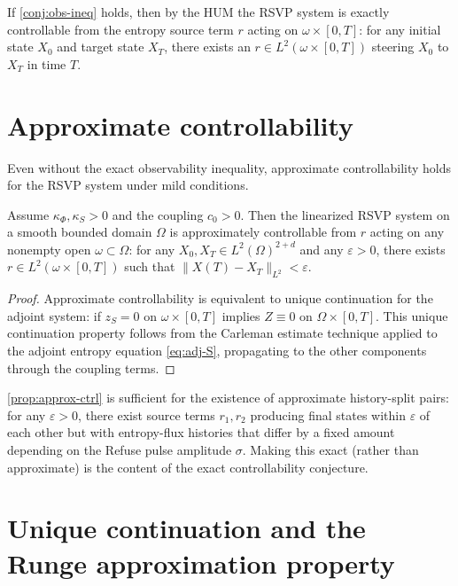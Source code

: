 \documentclass[12pt, oneside]{memoir}
\newcommand{\nnorm}[1]{\lVert #1 \rVert}
\begin{document}
If \cref{conj:obs-ineq} holds, then by the HUM the RSVP system is exactly controllable
from the entropy source term $r$ acting on $\omega \times [0,T]$: for any initial state
$X_0$ and target state $X_T$, there exists an $r \in L^2(\omega \times [0,T])$ steering
$X_0$ to $X_T$ in time $T$.

\section{Approximate controllability}

Even without the exact observability inequality, approximate controllability holds for
the RSVP system under mild conditions.

\begin{proposition}
\label{prop:approx-ctrl}
Assume $\kappa_\Phi, \kappa_S > 0$ and the coupling $c_0 > 0$.  Then the linearized
RSVP system on a smooth bounded domain $\Omega$ is approximately controllable from $r$
acting on any nonempty open $\omega \subset \Omega$: for any $X_0, X_T \in
L^2(\Omega)^{2+d}$ and any $\varepsilon > 0$, there exists $r \in L^2(\omega \times
[0,T])$ such that $\nnorm{X(T) - X_T}_{L^2} < \varepsilon$.
\end{proposition}

\begin{proof}
Approximate controllability is equivalent to unique continuation for the adjoint system:
if $z_S = 0$ on $\omega \times [0,T]$ implies $Z \equiv 0$ on $\Omega \times [0,T]$.
This unique continuation property follows from the Carleman estimate technique
\cite{zuazua2007} applied to the adjoint entropy equation \cref{eq:adj-S}, propagating
to the other components through the coupling terms.
\end{proof}

\begin{remark}
\cref{prop:approx-ctrl} is sufficient for the existence of approximate history-split
pairs: for any $\varepsilon > 0$, there exist source terms $r_1, r_2$ producing final
states within $\varepsilon$ of each other but with entropy-flux histories that differ by
a fixed amount depending on the Refuse pulse amplitude $\sigma$.  Making this exact
(rather than approximate) is the content of the exact controllability conjecture.
\end{remark}

\section{Unique continuation and the Runge approximation property}
\end{document}
